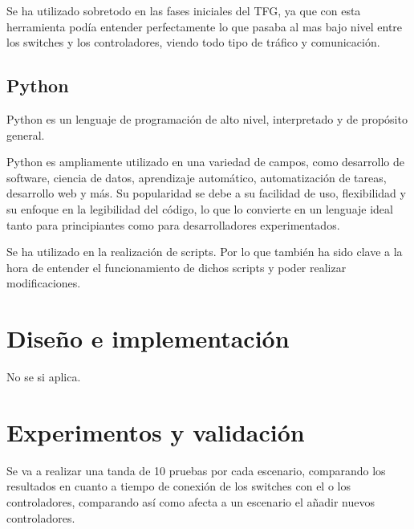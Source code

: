 \documentclass[a4paper, 12pt]{book}
\begin{document}
	Se ha utilizado sobretodo en las fases iniciales del TFG, ya que con esta herramienta podía entender perfectamente lo que pasaba al mas bajo nivel entre los switches y los controladores, viendo todo tipo de tráfico y comunicación.	
	
	\section{Python} 
	\label{sec:python}
	
	Python es un lenguaje de programación de alto nivel, interpretado y de propósito general. 
	
	Python es ampliamente utilizado en una variedad de campos, como desarrollo de software, ciencia de datos, aprendizaje automático, automatización de tareas, desarrollo web y más. Su popularidad se debe a su facilidad de uso, flexibilidad y su enfoque en la legibilidad del código, lo que lo convierte en un lenguaje ideal tanto para principiantes como para desarrolladores experimentados.
	
	Se ha utilizado en la realización de scripts. Por lo que también ha sido clave a la hora de entender el funcionamiento de dichos scripts y poder realizar modificaciones.
	
	
	\cleardoublepage
	\chapter{Diseño e implementación}
	\label{sec:diseno}
	 
	 No se si aplica.
	
	
	
	
	\cleardoublepage
	\chapter{Experimentos y validación}
	\label{chap:experimentos}
	
 	Se va a realizar una tanda de 10 pruebas por cada escenario, comparando los resultados en cuanto a tiempo de conexión de los switches con el o los controladores, comparando así como afecta a un escenario el añadir nuevos controladores.
	
\end{document}

